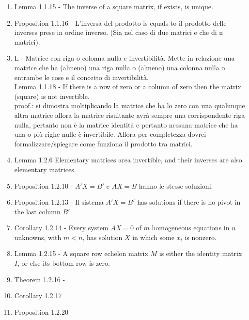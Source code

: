 \documentclass[]{article}
\begin{document}
\begin{enumerate}
\item Lemma 1.1.15 - The inverse of a square matrix, if exists, is unique.

\item Proposition 1.1.16 - L'inversa del prodotto is equals to il prodotto delle inverses prese in ordine inverso. (Sia nel caso di due matrici e che di n matrici).

\item L - Matrice con riga o colonna nulla e invertibilit\`a. 
      Mette in relazione una matrice che ha (almeno) una riga nulla o (almeno) una colonna nulla o entrambe le cose e il concetto di invertibilit\`a. \\          
      Lemma 1.1.18 - If there is a row of zero or a column of zero then the matrix (square) is not invertible. \\
      proof.: si dimostra moltiplicando la matrice che ha lo zero con una qualunque altra matrice allora la matrice risultante avr\`a sempre una corrispondente riga nulla, pertanto non \`e la matrice identit\`a e pertanto nessuna matrice che ha una o pi\`u righe nulle \`e invertibile. Allora per completezza dovrei formalizzare/spiegare come funziona il prodotto tra matrici.

\item Lemma 1.2.6 Elementary matrices area invertible, and their inverses are also elementary matrices.

\item Proposition 1.2.10 - $A'X=B'$ e $AX=B$ hanno le stesse soluzioni.

\item Proposition 1.2.13 - Il sistema $A'X=B'$ has solutions if there is no pivot in the last column $B'$.

\item Corollary 1.2.14 - Every system $AX=0$ of $m$ homogeneous equations in $n$ unknowns, with $m<n$, has solution $X$ in which some $x_i$ is nonzero.

\item Lemma 1.2.15 - A square row echelon matrix $M$ is either the identity matrix $I$, or else its bottom row is zero.

\item Theorem 1.2.16 - 

\item Corollary 1.2.17

\item Proposition 1.2.20


\end{enumerate}
\end{document}
